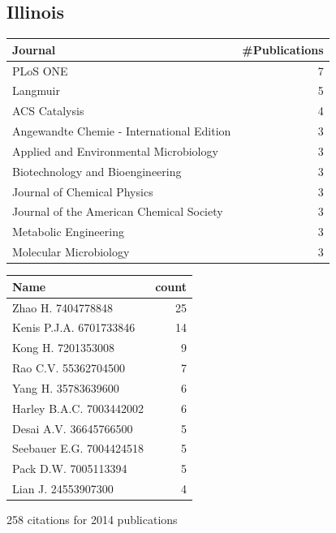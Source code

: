 \documentclass[11pt]{article}
\begin{document}
\subsection{Illinois}
\label{sec-1-15}
\begin{center}
\begin{tabular}{lr}
Journal & \#Publications\\
\hline
PLoS ONE & 7\\
Langmuir & 5\\
ACS Catalysis & 4\\
Angewandte Chemie - International Edition & 3\\
Applied and Environmental Microbiology & 3\\
Biotechnology and Bioengineering & 3\\
Journal of Chemical Physics & 3\\
Journal of the American Chemical Society & 3\\
Metabolic Engineering & 3\\
Molecular Microbiology & 3\\
\end{tabular}
\end{center}

\begin{center}
\begin{tabular}{lr}
Name & count\\
\hline
Zhao H. 7404778848 & 25\\
Kenis P.J.A. 6701733846 & 14\\
Kong H. 7201353008 & 9\\
Rao C.V. 55362704500 & 7\\
Yang H. 35783639600 & 6\\
Harley B.A.C. 7003442002 & 6\\
Desai A.V. 36645766500 & 5\\
Seebauer E.G. 7004424518 & 5\\
Pack D.W. 7005113394 & 5\\
Lian J. 24553907300 & 4\\
\end{tabular}
\end{center}

258 citations for 2014 publications
\end{document}
